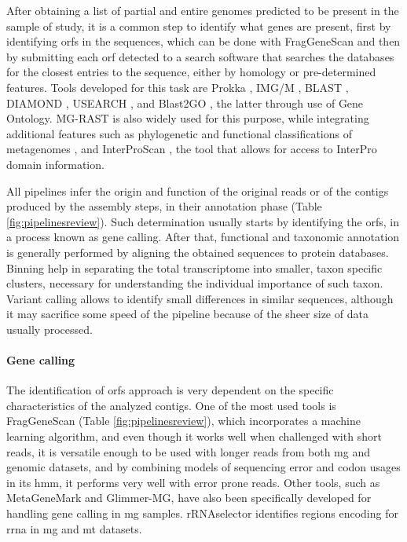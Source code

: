 \documentclass[
  oneside,
  11pt, a4paper,
  footinclude=true,
  headinclude=true,
  cleardoublepage=empty
]{scrbook}
\begin{document}
    After obtaining a list of partial and entire genomes predicted to be present in the sample of study, it is a common step to identify what genes are present, first by identifying \gls{orf}s in the sequences, which can be done with FragGeneScan \citep{rho2010fraggenescan} and then by submitting each \gls{orf} detected to a search software that searches the databases for the closest entries to the sequence, either by homology or pre-determined features. Tools developed for this task are Prokka \citep{seemann2014prokka}, IMG/M \citep{markowitz2008img}, BLAST \citep{altschul1990basic}, DIAMOND \citep{buchfink2015fast}, USEARCH \citep{edgar2010search}, and Blast2GO \citep{conesa2005blast2go}, the latter through use of Gene Ontology. MG-RAST \citep{glass2010using} is also widely used for this purpose, while integrating additional features such as phylogenetic and functional classifications of metagenomes \citep{meyer2008metagenomics}, and InterProScan \citep{Jones2014}, the tool that allows for access to InterPro domain information.
    
    All pipelines infer the origin and function of the original reads or of the contigs produced by the assembly steps, in their annotation phase (Table \ref{fig:pipelinesreview}). Such determination usually starts by identifying the \gls{orf}s, in a process known as gene calling. After that, functional and taxonomic annotation is generally performed by aligning the obtained sequences to protein databases. Binning help in separating the total transcriptome into smaller, taxon specific clusters, necessary for understanding the individual importance of such taxon. Variant calling allows to identify small differences in similar sequences, although it may sacrifice some speed of the pipeline because of the sheer size of data usually processed.
    
    \paragraph{Gene calling}
    
    The identification of \gls{orf}s approach is very dependent on the specific characteristics of the analyzed contigs. One of the most used tools is FragGeneScan (Table \ref{fig:pipelinesreview}), which incorporates a machine learning algorithm, and even though it works well when challenged with short reads, it is versatile enough to be used with longer reads from both \gls{mg} and genomic datasets, and by combining models of sequencing error and codon usages in its \gls{hmm}, it performs very well with error prone reads. Other tools, such as MetaGeneMark and Glimmer-MG, have also been specifically developed for handling gene calling in \gls{mg} samples. rRNAselector identifies regions encoding for \gls{rrna} in \gls{mg} and \gls{mt} datasets.
    
\end{document}
